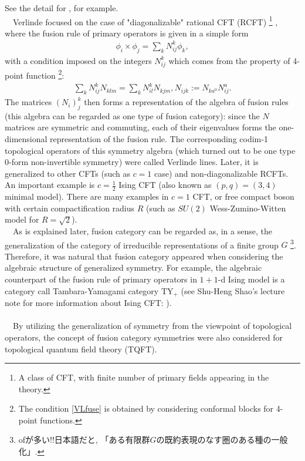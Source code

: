 \documentclass{ltjsarticle}
\theoremstyle{mystyle} %
\numberwithin{equation}{section}
\begin{document}
See the detail for \cite{Hikida}, for example. \\
　Verlinde\cite{EV} focused on the case of "diagonalizable" rational CFT (RCFT)
\footnote{A class of CFT, with finite number of primary fields appearing in the theory. }
, where the fusion rule of primary operators is given in a simple form
\begin{align}
    \phi_i \times \phi_j = \sum_{k}N_{ij}^k \phi_k, 
\end{align}
with a condition imposed on the integers $N_{ij}^k$ which comes from the property of 4-point function
\footnote{The condition \eqref{VLfuse} is obtained by considering conformal blocks for 4-point functions. }: 
\begin{align}
    \sum_{k}N_{ij}^{k}N_{klm} = \sum_{k}N_{il}^kN_{kjm}, N_{ijk} := N_{ka^0}N_{ij}^{a}. 
    \label{VLfuse}
\end{align}
The matrices $(N_i)_j^k$ then forms a representation of the algebra of fusion rules 
(this algebra can be regarded as one type of fusion category): 
since the $N$ matrices are symmetric and commuting, each of their eigenvalues forms the one-dimensional representation of the fusion rule. 
The corresponding codim-1 topological operators of this symmetry algebra (which turned out to be one type $0$-form non-invertible symmetry) were called 
Verlinde lines. 
Later, it is generalized to other CFTs (such as $c=1$ case) and non-diagonalizable RCFTs. 
An important example is $c=\frac{1}{2}$ Ising CFT (also known as $(p,q)=(3,4)$ minimal model). 
There are many examples in $c=1$ CFT, or free compact boson with certain compactification radius $R$ 
(such as $SU(2)$ Wess-Zumino-Witten model for $R=\sqrt{2}$). \\
　As is explained later, fusion category can be regarded as, in a sense, the generalization of the category of
irreducible representations of a finite group $G$
\footnote{ofが多い!!日本語だと, 「ある有限群$G$の既約表現のなす圏のある種の一般化」. }. 
Therefore, it was natural that fusion category appeared when considering the algebraic structure of generalized symmetry. 
For example, the algebraic counterpart of the fusion rule of primary operators in $1+1$-d Ising model is 
a category call Tambara-Yamagami category $\mathrm{TY}_{+}$
(see Shu-Heng Shao's lecture note for more information about Ising CFT: 
\cite{SHS}). 
\\
\\
　By utilizing the generalization of symmetry from the viewpoint of topological operators, 
the concept of fusion category symmetries were also considered for topological quantum field theory (TQFT). 
\end{document}
